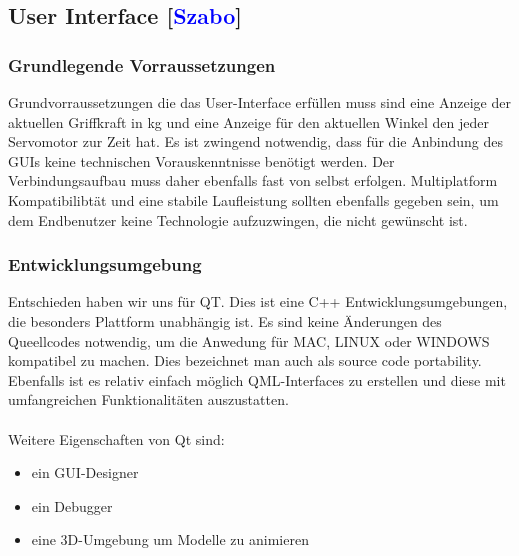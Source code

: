 \documentclass[titlepage,12pt,twoside]{article}
\begin{document}
\newpage
\subsection{User Interface [\textcolor{blue}{Szabo}]}
\label{chap:User Interface}

\subsubsection{Grundlegende Vorraussetzungen}
Grundvorraussetzungen die das User-Interface erfüllen muss sind eine Anzeige der aktuellen Griffkraft in kg und eine Anzeige für
den aktuellen Winkel den jeder Servomotor zur Zeit hat. Es ist zwingend notwendig, dass für die Anbindung des GUIs keine technischen
Vorauskenntnisse benötigt werden. Der Verbindungsaufbau muss daher ebenfalls fast von selbst erfolgen. Multiplatform Kompatibilibtät
und eine stabile Laufleistung sollten ebenfalls gegeben sein, um dem Endbenutzer keine Technologie aufzuzwingen, die nicht gewünscht ist.

\subsubsection{Entwicklungsumgebung}

Entschieden haben wir uns für QT. Dies ist eine C++ Entwicklungsumgebungen, die besonders Plattform unabhängig ist. Es sind keine Änderungen
des Queellcodes notwendig, um die Anwedung für MAC, LINUX oder WINDOWS kompatibel zu machen. Dies bezeichnet man auch als source 
code portability. Ebenfalls ist es relativ einfach möglich QML-Interfaces zu erstellen und diese mit umfangreichen Funktionalitäten auszustatten. \\
\\ 
Weitere Eigenschaften von Qt sind:
\begin{itemize}
	\item ein GUI-Designer
	\item ein Debugger
	\item eine 3D-Umgebung um Modelle zu animieren
\end{itemize}
\newpage
\end{document}
